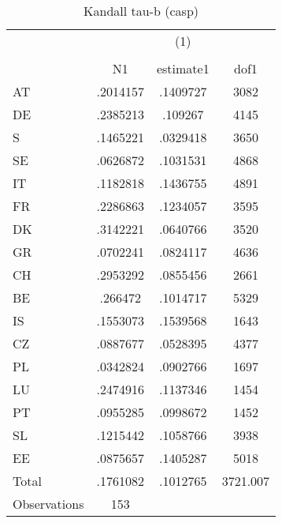 \begin{table}[htbp]\centering
\def\sym#1{\ifmmode^{#1}\else\(^{#1}\)\fi}
\caption{Kandall tau-b (casp)}
\begin{tabular}{l*{1}{ccc}}
\hline\hline
                    &\multicolumn{3}{c}{(1)}               \\
                    &\multicolumn{3}{c}{}                  \\
                    &          N1&   estimate1&        dof1\\
\hline
AT                  &    .2014157&    .1409727&        3082\\
DE                  &    .2385213&     .109267&        4145\\
S                   &    .1465221&    .0329418&        3650\\
SE                  &    .0626872&    .1031531&        4868\\
IT                  &    .1182818&    .1436755&        4891\\
FR                  &    .2286863&    .1234057&        3595\\
DK                  &    .3142221&    .0640766&        3520\\
GR                  &    .0702241&    .0824117&        4636\\
CH                  &    .2953292&    .0855456&        2661\\
BE                  &     .266472&    .1014717&        5329\\
IS                  &    .1553073&    .1539568&        1643\\
CZ                  &    .0887677&    .0528395&        4377\\
PL                  &    .0342824&    .0902766&        1697\\
LU                  &    .2474916&    .1137346&        1454\\
PT                  &    .0955285&    .0998672&        1452\\
SL                  &    .1215442&    .1058766&        3938\\
EE                  &    .0875657&    .1405287&        5018\\
Total               &    .1761082&    .1012765&    3721.007\\
\hline
Observations        &         153&            &            \\
\hline\hline
\end{tabular}
\end{table}
